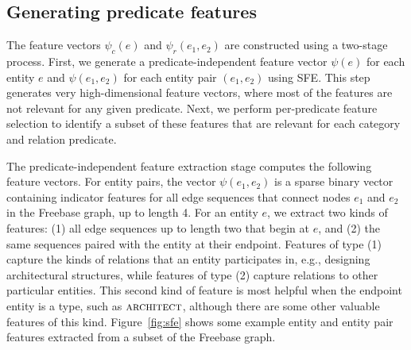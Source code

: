 \documentclass[11pt]{article}
\newcommand{\figref}[1]{Figure~\ref{fig:#1}}
\newcommand{\entity}[1]{\ensuremath{\textsc{#1}}}
\begin{document}

\subsection{Generating predicate features}
\label{sec:feature-generation}

The feature vectors $\psi_c(e)$ and $\psi_r(e_1, e_2)$ are constructed
using a two-stage process. First, we generate a predicate-independent
feature vector $\psi(e)$ for each entity $e$ and $\psi(e_1, e_2)$ for
each entity pair $(e_1, e_2)$ using SFE. This step generates very
high-dimensional feature vectors, where most of the
features are not relevant for any given predicate. Next, we perform
per-predicate feature selection to identify a subset of these features
that are relevant for each category and relation predicate.

The predicate-independent feature extraction stage computes the
following feature vectors. For entity pairs, the vector $\psi(e_1,
e_2)$ is a sparse binary vector containing indicator features for all
edge sequences that connect nodes $e_1$ and $e_2$ in the Freebase
graph, up to length 4.  For an entity $e$, we extract two kinds of
features: (1) all edge sequences up to length two that begin at $e$,
and (2) the same sequences paired with the entity at their
endpoint. Features of type (1) capture the kinds of relations that an
entity participates in, e.g., designing architectural structures,
while features of type (2) capture relations to other particular
entities. This second kind of feature is most helpful when the
endpoint entity is a type, such as \entity{architect}, although there
are some other valuable features of this kind. \figref{sfe} shows some
example entity and entity pair features extracted from a subset of the
Freebase graph.


% 
\end{document}
